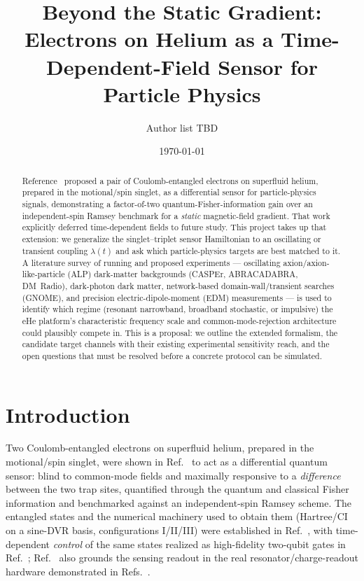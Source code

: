 \documentclass[aps,prxquantum,reprint,superscriptaddress,longbibliography]{revtex4-2}
\begin{document}
\title{Beyond the Static Gradient: Electrons on Helium as a Time-Dependent-Field Sensor for
Particle Physics}

\author{Author list TBD}

\date{\today}

\begin{abstract}
Reference~\cite{perruzza2026} proposed a pair of Coulomb-entangled electrons on superfluid helium,
prepared in the motional/spin singlet, as a differential sensor for particle-physics signals,
demonstrating a factor-of-two quantum-Fisher-information gain over an independent-spin Ramsey
benchmark for a \emph{static} magnetic-field gradient. That work explicitly deferred time-dependent
fields to future study. This project takes up that extension: we generalize the singlet--triplet
sensor Hamiltonian to an oscillating or transient coupling $\lambda(t)$ and ask which particle-physics
targets are best matched to it. A literature survey of running and proposed experiments —
oscillating axion/axion-like-particle (ALP) dark-matter backgrounds (CASPEr, ABRACADABRA, DM~Radio),
dark-photon dark matter, network-based domain-wall/transient searches (GNOME), and precision
electric-dipole-moment (EDM) measurements — is used to identify which regime (resonant narrowband,
broadband stochastic, or impulsive) the eHe platform's characteristic frequency scale and
common-mode-rejection architecture could plausibly compete in. This is a proposal: we outline the
extended formalism, the candidate target channels with their existing experimental sensitivity
reach, and the open questions that must be resolved before a concrete protocol can be simulated.
\end{abstract}

\maketitle

\section{Introduction}
\label{sec:intro}

Two Coulomb-entangled electrons on superfluid helium, prepared in the motional/spin singlet, were
shown in Ref.~\cite{perruzza2026} to act as a differential quantum sensor: blind to common-mode
fields and maximally responsive to a \emph{difference} between the two trap sites, quantified through
the quantum and classical Fisher information and benchmarked against an independent-spin Ramsey
scheme. The entangled states and the numerical machinery used to obtain them (Hartree/CI on a
sine-DVR basis, configurations I/II/III) were established in Ref.~\cite{beysengulov2024}, with
time-dependent \emph{control} of the same states realized as high-fidelity two-qubit gates in
Ref.~\cite{leinonen2025}; Ref.~\cite{perruzza2026} also grounds the sensing readout in the real
resonator/charge-readout hardware demonstrated in Refs.~\cite{koolstra2025impedance,castoria2025}.
\end{document}
